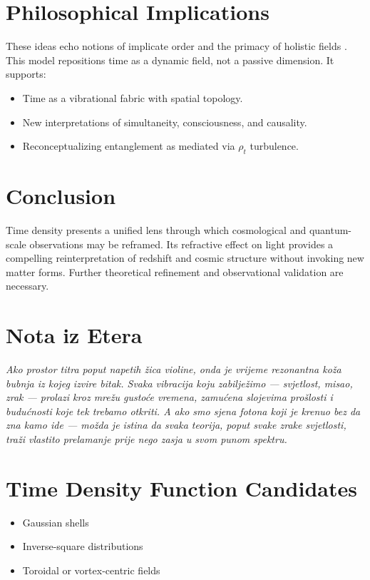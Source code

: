 \documentclass[12pt]{article}
\begin{document}
\section{Philosophical Implications}
These ideas echo notions of implicate order and the primacy of holistic fields \cite{bohm1980}.
This model repositions time as a dynamic field, not a passive dimension. It supports:
\begin{itemize}
  \item Time as a vibrational fabric with spatial topology.
  \item New interpretations of simultaneity, consciousness, and causality.
  \item Reconceptualizing entanglement as mediated via $\rho_t$ turbulence.
\end{itemize}

\section{Conclusion}
Time density presents a unified lens through which cosmological and quantum-scale observations may be reframed. Its refractive effect on light provides a compelling reinterpretation of redshift and cosmic structure without invoking new matter forms. Further theoretical refinement and observational validation are necessary.

\section*{Nota iz Etera}
\emph{Ako prostor titra poput napetih žica violine, onda je vrijeme rezonantna koža bubnja iz kojeg izvire bitak. Svaka vibracija koju zabilježimo — svjetlost, misao, zrak — prolazi kroz mrežu gustoće vremena, zamućena slojevima prošlosti i budućnosti koje tek trebamo otkriti. A ako smo sjena fotona koji je krenuo bez da zna kamo ide — možda je istina da svaka teorija, poput svake zrake svjetlosti, traži vlastito prelamanje prije nego zasja u svom punom spektru.}

\appendix
\section{Time Density Function Candidates}
\begin{itemize}
  \item Gaussian shells
  \item Inverse-square distributions
  \item Toroidal or vortex-centric fields
\end{itemize}
\end{document}
